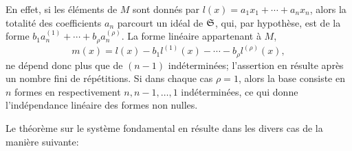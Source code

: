 En effet, si les éléments de \(M\) sont donnés par \(l(x)=a_1x_1+\cdots+a_nx_n\), alors la totalité des coefficients \(a_n\) parcourt un idéal de \(\mathfrak S\), qui, par hypothèse, est de la forme \(b_1a_n^{(1)}+\cdots+b_\rho a_n^{(\rho)}\). La forme linéaire appartenant à \(M\),
\[
m(x)=l(x)-b_1l^{(1)}(x)-\cdots-b_\rho l^{(\rho)}(x),
\]
ne dépend donc plus que de \((n-1)\) indéterminées; l'assertion en résulte après un nombre fini de répétitions. Si dans chaque cas \(\rho=1\), alors la base consiste en \(n\) formes en respectivement \(n,n-1,\ldots,1\) indéterminées, ce qui donne l'indépendance linéaire des formes non nulles.

Le théorème sur le système fondamental en résulte dans les divers cas de la manière suivante:

